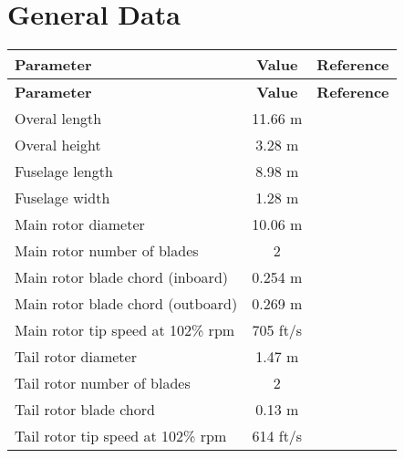 \section{General Data}

\begin{tabularx}{\textwidth}{ | L | c | c | }
  \hline
  \textbf{Parameter}                    & \textbf{Value}   & \textbf{Reference} \\ \hline
  \endfirsthead
  \hline
  \textbf{Parameter}                    & \textbf{Value}   & \textbf{Reference} \\ \hline
  \endhead
  Overal length                         & 11.66 m          & \cite{R44_PilotsOperatingHandbook,EASA-IM-R-121} \\ \hline
  Overal height                         & 3.28 m           & \cite{R44_PilotsOperatingHandbook,Janes20072008} \\ \hline
  Fuselage length                       & 8.98 m           & \cite{R44_PilotsOperatingHandbook} \\ \hline
  Fuselage width                        & 1.28 m           & \cite{R44_PilotsOperatingHandbook,Janes20072008} \\ \hline
  Main rotor diameter                   & 10.06 m          & \cite{R44_PilotsOperatingHandbook,EASA-IM-R-121,Janes20072008} \\ \hline
  Main rotor number of blades           & 2                & \cite{R44_PilotsOperatingHandbook,Janes20072008} \\ \hline
  Main rotor blade chord (inboard)      & 0.254 m          & \cite{R44_PilotsOperatingHandbook} \\ \hline
  Main rotor blade chord (outboard)     & 0.269 m          & \cite{R44_PilotsOperatingHandbook} \\ \hline
  Main rotor tip speed at 102\% rpm     & 705 ft/s         & \cite{R44_PilotsOperatingHandbook} \\ \hline
  Tail rotor diameter                   & 1.47 m           & \cite{R44_PilotsOperatingHandbook,EASA-IM-R-121,Janes20072008} \\ \hline
  Tail rotor number of blades           & 2                & \cite{R44_PilotsOperatingHandbook} \\ \hline
  Tail rotor blade chord                & 0.13 m           & \cite{R44_PilotsOperatingHandbook} \\ \hline
  Tail rotor tip speed at 102\% rpm     & 614 ft/s         & \cite{R44_PilotsOperatingHandbook} \\ \hline

\end{tabularx}
